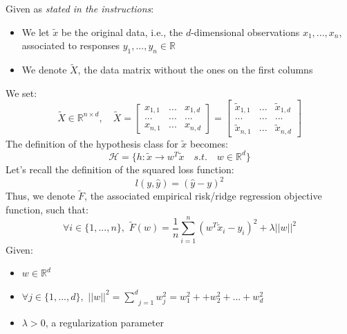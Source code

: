 \documentclass{homework}
\begin{document}
Given as \textit{stated in the instructions}:
\begin{itemize}
    \item We let $\tilde{x}$ be the original data, i.e., the $d$-dimensional observations $x_1, ..., x_n$, 
    associated to responses $y_1,...,y_n\in\mathbb{R}$
    \item We denote $\tilde{X}$, the data matrix without the ones on the first columns
\end{itemize}
We set:
$$\tilde{X}\in\mathbb{R}^{n\times d},\quad\tilde{X}=\begin{bmatrix}
x_{1,1} & ... & x_{1, d}\\
... & ... & ... \\
x_{n,1} & ... & x_{n, d}
\end{bmatrix}=\begin{bmatrix}
\tilde{x}_{1,1} & ... & \tilde{x}_{1, d}\\
... & ... & ... \\
\tilde{x}_{n,1} & ... & \tilde{x}_{n, d}
\end{bmatrix}$$
The definition of the hypothesis class for $\tilde{x}$ becomes:
$$\mathcal{H}=\{h:\tilde{x}\rightarrow w^T\tilde{x}\quad{s.t.}\quad w\in\mathbb{R}^d\}$$
Let's recall the definition of the squared loss function:
$$l(y,\hat{y})=(\hat{y}-y)^2$$
Thus, we denote $\tilde{F}$, the associated empirical risk/ridge regression objective function, such that:
$$\forall i\in\{1,...,n\},\,\,\tilde{F}(w)=\frac{1}{n}\underset{i=1}{\overset{n}{\sum}}(w^T\tilde{x}_i-y_i)^2+\lambda||w||^2$$
Given:
\begin{itemize}
    \item $w\in\mathbb{R}^d$
    \item $\forall j \in \{1,...,d\},\,\,||w||^2=\underset{j=1}{\overset{d}{\sum}}w_j^2=w_1^2++w_2^2+...+w_d^2$
    \item $\lambda >0$, a regularization parameter
\end{itemize}
\end{document}
